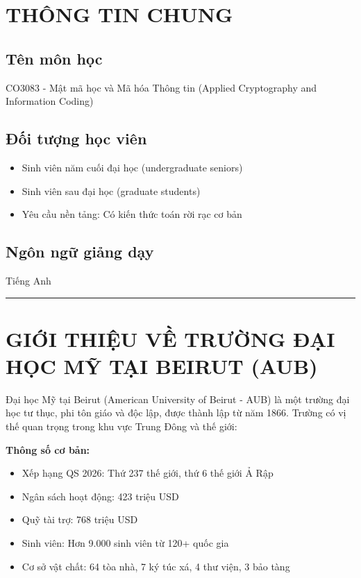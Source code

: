 \section{THÔNG TIN CHUNG}

\subsection{Tên môn học}
CO3083 - Mật mã học và Mã hóa Thông tin (Applied Cryptography and Information Coding)

\subsection{Đối tượng học viên}
\begin{itemize}
\item Sinh viên năm cuối đại học (undergraduate seniors)
\item Sinh viên sau đại học (graduate students)
\item Yêu cầu nền tảng: Có kiến thức toán rời rạc cơ bản
\end{itemize}

\subsection{Ngôn ngữ giảng dạy}
Tiếng Anh

\vspace{0.5cm}
\rule{\textwidth}{1pt}
\vspace{0.5cm}

\section{GIỚI THIỆU VỀ TRƯỜNG ĐẠI HỌC MỸ TẠI BEIRUT (AUB)}

Đại học Mỹ tại Beirut (American University of Beirut - AUB) là một trường đại học tư thục, phi tôn giáo và độc lập, được thành lập từ năm 1866. Trường có vị thế quan trọng trong khu vực Trung Đông và thế giới:

\textbf{Thông số cơ bản:}
\begin{itemize}
\item Xếp hạng QS 2026: Thứ 237 thế giới, thứ 6 thế giới Ả Rập
\item Ngân sách hoạt động: 423 triệu USD
\item Quỹ tài trợ: 768 triệu USD
\item Sinh viên: Hơn 9.000 sinh viên từ 120+ quốc gia
\item Cơ sở vật chất: 64 tòa nhà, 7 ký túc xá, 4 thư viện, 3 bảo tàng
\end{itemize}

